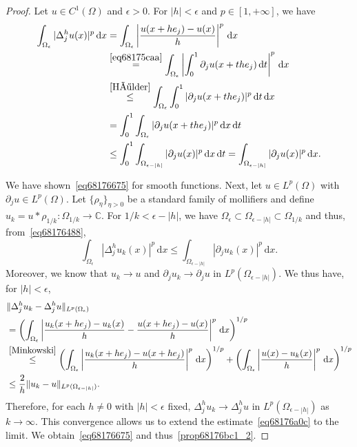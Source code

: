 \documentclass[a4paper,9pt]{amsart}
\newcommand{\C}{\mathbb{C}}	%
\newcommand{\did}{\,\mathrm{d}}	%
\newcommand{\de}{\partial}		%
\newcommand{\THEN}{\Rightarrow}	%
\theoremstyle{plain}
\theoremstyle{definition}
\theoremstyle{remark}
\begin{document}
\begin{proof}
	\framebox{$\ref{prop68176bc1_1}\THEN\ref{prop68176bc1_2}$: case $p\in(1,\infty)$.}
	Let $u\in C^1(\Omega)$ and $\epsilon>0$.
	For $|h|<\epsilon$ and $p\in[1,+\infty]$, we have
	\begin{equation}\label{eq68176488}
	\begin{aligned}
		\int_{\Omega_\epsilon} |\Delta_j^hu(x)|^p \did x
		&= \int_{\Omega_\epsilon} \left| \frac{u(x+he_j)-u(x)}{h} \right|^p \did x \\
		&\overset{\eqref{eq68175caa}}= \int_{\Omega_\epsilon} \left| \int_0^1 \de_ju(x+th e_j) \did t \right|^p \did x \\
		&\overset{\eqref{Hölder}}\le \int_{\Omega_\epsilon}  \int_0^1 |\de_ju(x+th e_j)|^p \did t \did x \\
		&= \int_0^1 \int_{\Omega_\epsilon}   |\de_ju(x+th e_j)|^p  \did x \did t \\
		&\le \int_0^1 \int_{\Omega_{\epsilon-|h|}}   |\de_ju(x)|^p  \did x \did t 
		= \int_{\Omega_{\epsilon-|h|}}   |\de_ju(x)|^p  \did x .
	\end{aligned}
	\end{equation}
	
	We have shown~\eqref{eq68176675} for smooth functions.
	Next, let $u\in L^p(\Omega)$ with $\de_ju\in L^p(\Omega)$.
	Let $\{\rho_\eta\}_{\eta>0}$ be a standard family of mollifiers and define $u_k = u*\rho_{1/k}:\Omega_{1/k}\to\C$.
	For $1/k<\epsilon-|h|$, we have $\Omega_\epsilon\subset \Omega_{\epsilon-|h|}\subset \Omega_{1/k}$ and thus, from~\eqref{eq68176488},
	\begin{equation}\label{eq68176a0c}
		\int_{\Omega_\epsilon} |\Delta_j^hu_k(x)|^p \did x 
		\le \int_{\Omega_{\epsilon-|h|}}   |\de_ju_k(x)|^p  \did x .
	\end{equation}
	Moreover, we know that $u_k\to u$ and $\de_ju_k\to \de_ju$ in $L^p(\Omega_{\epsilon-|h|})$.
	We thus have, for $|h|<\epsilon$,
	\begin{align}
		&\|\Delta^h_ju_k - \Delta^h_ju\|_{L^p(\Omega_\epsilon)} \\
		&= \left( \int_{\Omega_\epsilon} \left| \frac{u_k(x+he_j) - u_k(x)}{h} - \frac{u(x+he_j)-u(x)}{h} \right|^p \did x \right)^{1/p} \\
		&\overset{\eqref{Minkowski}}\le \left( \int_{\Omega_\epsilon} \left| \frac{u_k(x+he_j) - u(x+he_j)}{h} \right|^p \did x \right)^{1/p} 
		+ \left( \int_{\Omega_\epsilon} \left| \frac{u(x) - u_k(x)}{h} \right|^p \did x \right)^{1/p} \\
		&\le \frac2h \|u_k-u\|_{L^p(\Omega_{\epsilon-|h|})} . 
	\end{align}
	Therefore, for each $h\neq0$ with $|h|<\epsilon$ fixed, 
	$\Delta^h_ju_k\to \Delta^h_ju$ in $L^p(\Omega_{\epsilon-|h|})$ as $k\to\infty$.
	This convergence allows us to extend the estimate~\eqref{eq68176a0c} to the limit.
	We obtain~\eqref{eq68176675} and thus~\ref{prop68176bc1_2}.
	

\end{proof}
\end{document}

